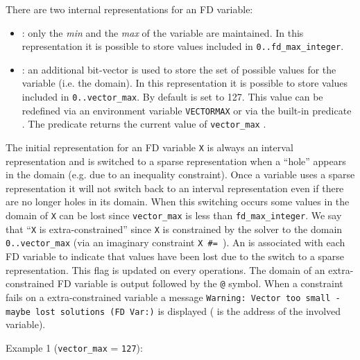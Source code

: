 There are two internal representations for an FD variable:

\begin{itemize}

\item {}: only the \emph{min} and the
  \emph{max} of the variable are maintained. In this representation it is
  possible to store values included in \texttt{0..fd\_max\_integer}.

\item {}: an additional bit-vector is used to
  store the set of possible values for the variable (i.e. the domain). In
  this representation it is possible to store values included in
  \texttt{0..vector\_max}. By default  is set to 127.
  This value can be redefined via an environment variable \texttt{VECTORMAX}
  or via the built-in predicate 
  .  The predicate 
  returns the current value of \texttt{vector\_max}
  .

\end{itemize}

The initial representation for an FD variable \texttt{X} is always an
interval representation and is switched to a sparse representation when a
``hole'' appears in the domain (e.g. due to an inequality constraint). Once a
variable uses a sparse representation it will not switch back to an interval
representation even if there are no longer holes in its domain. When this
switching occurs some values in the domain of \texttt{X} can be lost since
\texttt{vector\_max} is less than \texttt{fd\_max\_integer}. We say that
``\texttt{X} is extra-constrained'' since
\texttt{X} is constrained by the solver to the domain
\texttt{0..vector\_max} (via an imaginary constraint
\texttt{X \#={\lt} }). An  is
associated with each FD variable to indicate that values have been lost due to
the switch to a sparse representation. This flag is updated on every
operations. The domain of an extra-constrained FD variable is output followed
by the \texttt{@} symbol. When a constraint fails on a extra-constrained
variable a message \texttt{Warning: Vector too small - maybe lost solutions
  (FD Var:)} is displayed ( is the address of the involved
variable).

Example 1 (\texttt{vector\_max} = \texttt{127}):

